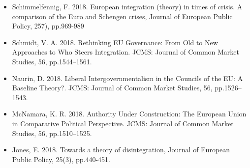 \begin{itemize}
	\item Schimmelfennig, F. 2018. European integration (theory) in times of crisis. A comparison of the Euro and Schengen crises, Journal of European Public Policy, 257), pp.969-989
	\item Schmidt, V. A. 2018. Rethinking EU Governance: From Old to New Approaches to Who Steers Integration. JCMS: Journal of Common Market Studies, 56, pp.1544–1561.
	\item Naurin, D. 2018. Liberal Intergovernmentalism in the Councils of the EU: A Baseline Theory?. JCMS: Journal of Common Market Studies, 56, pp.1526–1543.
	\item McNamara, K. R. 2018. Authority Under Construction: The European Union in Comparative Political Perspective. JCMS: Journal of Common Market Studies, 56, pp.1510–1525. 
	\item Jones, E. 2018. Towards a theory of disintegration, Journal of European Public Policy, 25(3), pp.440-451.
\end{itemize}
